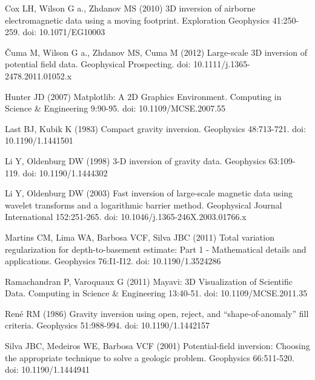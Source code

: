 \documentclass[twocolumn,final]{svjour3}
\begin{document}
\begin{thebibliography}{}

Cox LH, Wilson G a., Zhdanov MS (2010)
3D inversion of airborne electromagnetic data using a moving footprint.
Exploration Geophysics 41:250-259. doi: 10.1071/EG10003

\v{C}uma M, Wilson G a., Zhdanov MS, Cuma M (2012)
Large-scale 3D inversion of potential field data. Geophysical Prospecting.
doi: 10.1111/j.1365-2478.2011.01052.x

Hunter JD (2007)
Matplotlib: A 2D Graphics Environment. Computing in Science \& Engineering
9:90-95. doi: 10.1109/MCSE.2007.55

Last BJ, Kubik K (1983)
Compact gravity inversion. Geophysics 48:713-721. doi: 10.1190/1.1441501

Li Y, Oldenburg DW (1998)
3-D inversion of gravity data. Geophysics 63:109-119.
doi: 10.1190/1.1444302

Li Y, Oldenburg DW (2003)
Fast inversion of large-scale magnetic data using wavelet transforms and a
logarithmic barrier method. Geophysical Journal International 152:251-265.
doi: 10.1046/j.1365-246X.2003.01766.x

Martins CM, Lima WA, Barbosa VCF, Silva JBC (2011)
Total variation regularization for depth-to-basement estimate:
Part 1 - Mathematical details and applications. Geophysics 76:I1-I12.
doi: 10.1190/1.3524286

Ramachandran P, Varoquaux G (2011)
Mayavi: 3D Visualization of Scientific Data. Computing in Science \& Engineering
13:40-51. doi: 10.1109/MCSE.2011.35

Ren\'e RM (1986)
Gravity inversion using open, reject, and ``shape-of-anomaly'' fill criteria.
Geophysics 51:988-994. doi: 10.1190/1.1442157

Silva JBC, Medeiros WE, Barbosa VCF (2001)
Potential-field inversion: Choosing the appropriate technique to solve a
geologic problem. Geophysics 66:511-520. doi: 10.1190/1.1444941


\end{thebibliography}
\end{document}
